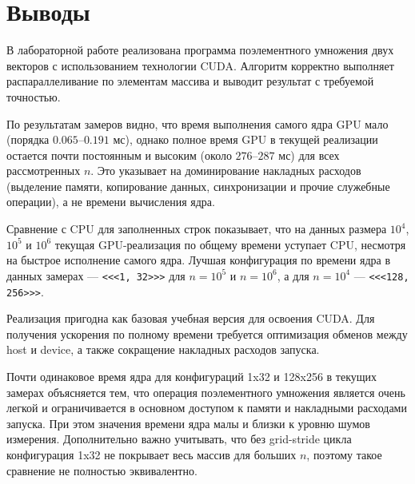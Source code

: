 \documentclass[a4paper,14pt]{extarticle}
\begin{document}
\section*{Выводы}
\begin{sloppypar}
В лабораторной работе реализована программа поэлементного умножения двух
векторов с использованием технологии CUDA. Алгоритм корректно выполняет
распараллеливание по элементам массива и выводит результат с требуемой точностью.

По результатам замеров видно, что время выполнения самого ядра GPU мало
(порядка $0.065\mbox{--}0.191$ мс), однако полное время GPU в текущей реализации
остается почти постоянным и высоким (около $276\mbox{--}287$ мс) для всех рассмотренных $n$.
Это указывает на доминирование накладных расходов (выделение памяти, копирование
данных, синхронизации и прочие служебные операции), а не времени вычисления ядра.

Сравнение с CPU для заполненных строк показывает, что на данных размера
$10^4$, $10^5$ и $10^6$ текущая GPU-реализация по общему времени уступает CPU,
несмотря на быстрое исполнение самого ядра. Лучшая конфигурация по времени ядра
в данных замерах --- \texttt{<<<1, 32>>>} для $n=10^5$ и $n=10^6$,
а для $n=10^4$ --- \texttt{<<<128, 256>>>}.

Реализация пригодна как базовая учебная версия для освоения CUDA.
Для получения ускорения по полному времени требуется оптимизация обменов
между host и device, а также сокращение накладных расходов запуска.

Почти одинаковое время ядра для конфигураций 1x32 и 128x256 в текущих
замерах объясняется тем, что операция
поэлементного умножения является очень легкой и ограничивается в основном
доступом к памяти и накладными расходами запуска. При этом значения времени
ядра малы и близки к уровню шумов измерения. Дополнительно важно учитывать,
что без grid-stride цикла конфигурация 1x32 не покрывает весь
массив для больших $n$, поэтому такое сравнение не полностью эквивалентно.
\end{sloppypar}
\end{document}
